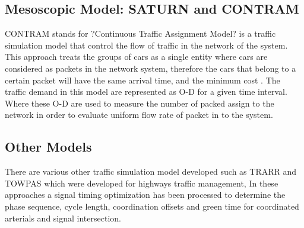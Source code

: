  \subsection{Mesoscopic Model: SATURN and CONTRAM}
 CONTRAM stands for ?Continuous Traffic Assignment Model? is a traffic simulation model that control the flow of traffic in the network of the system. This approach treats the groups of cars as a single entity where cars are considered as packets in the network system, therefore the cars that belong to a certain packet will have the same arrival time, and the minimum cost \cite{smith}. The traffic demand in this model are represented as O-D for a given time interval. Where these O-D are used to measure the number of packed assign to the network in order to evaluate uniform flow rate of packet in to the system.
 
  \subsection{Other Models }
There are various other traffic simulation model developed such as TRARR and TOWPAS which were developed for highways traffic management, In these approaches a signal timing optimization has been processed to determine the phase sequence, cycle length, coordination offsets and green time for coordinated arterials and signal intersection. \newline

  

